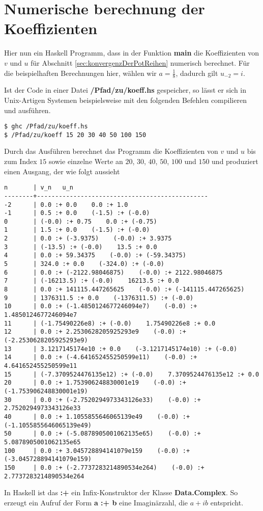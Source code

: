 \chapter{Numerische berechnung der Koeffizienten} \label{anh:Programm}
Hier nun ein Haskell Programm, dass in der Funktion \textbf{main} die
Koeffizienten von $v$ und $u$ für Abschnitt \ref{sec:konvergenzDerPotReihen} 
numerisch berechnet. Für die beispielhaften Berechnungen hier, wählen wir
$a=\frac{1}{8}$, dadurch gilt $u_{-2}=i$.


Ist der Code in einer Datei \textbf{/Pfad/zu/koeff.hs} gespeicher, so lässt er
sich in Unix-Artigen Systemen beispielsweise mit den folgenden Befehlen
compilieren und ausführen.
\begin{lstlisting}[style=Bash]
$ ghc /Pfad/zu/koeff.hs
$ /Pfad/zu/koeff 15 20 30 40 50 100 150
\end{lstlisting}
Durch das Ausführen berechnet das Programm die Koeffizienten von $v$ und $u$
bis zum Index $15$ sowie einzelne Werte an $20$, $30$, $40$, $50$, $100$ und
$150$ und produziert einen Ausgang, der wie folgt aussieht
\begin{lstlisting}[style=Bash]
n       | v_n   u_n
--------+-----------------------------------------------
-2      | 0.0 :+ 0.0    0.0 :+ 1.0
-1      | 0.5 :+ 0.0    (-1.5) :+ (-0.0)
0       | (-0.0) :+ 0.75    0.0 :+ (-0.75)
1       | 1.5 :+ 0.0    (-1.5) :+ (-0.0)
2       | 0.0 :+ (-3.9375)    (-0.0) :+ 3.9375
3       | (-13.5) :+ (-0.0)    13.5 :+ 0.0
4       | 0.0 :+ 59.34375    (-0.0) :+ (-59.34375)
5       | 324.0 :+ 0.0    (-324.0) :+ (-0.0)
6       | 0.0 :+ (-2122.98046875)    (-0.0) :+ 2122.98046875
7       | (-16213.5) :+ (-0.0)    16213.5 :+ 0.0
8       | 0.0 :+ 141115.447265625    (-0.0) :+ (-141115.447265625)
9       | 1376311.5 :+ 0.0    (-1376311.5) :+ (-0.0)
10      | 0.0 :+ (-1.4850124677246094e7)    (-0.0) :+ 1.4850124677246094e7
11      | (-1.75490226e8) :+ (-0.0)    1.75490226e8 :+ 0.0
12      | 0.0 :+ 2.2530628205925293e9    (-0.0) :+ (-2.2530628205925293e9)
13      | 3.1217145174e10 :+ 0.0    (-3.1217145174e10) :+ (-0.0)
14      | 0.0 :+ (-4.641652455250599e11)    (-0.0) :+ 4.641652455250599e11
15      | (-7.3709524476135e12) :+ (-0.0)    7.3709524476135e12 :+ 0.0
20      | 0.0 :+ 1.753906248830001e19    (-0.0) :+ (-1.753906248830001e19)
30      | 0.0 :+ (-2.7520294973343126e33)    (-0.0) :+ 2.7520294973343126e33
40      | 0.0 :+ 1.1055855646065139e49    (-0.0) :+ (-1.1055855646065139e49)
50      | 0.0 :+ (-5.0878905001062135e65)    (-0.0) :+ 5.0878905001062135e65
100     | 0.0 :+ 3.045728894141079e159    (-0.0) :+ (-3.045728894141079e159)
150     | 0.0 :+ (-2.7737283214890534e264)    (-0.0) :+ 2.7737283214890534e264
\end{lstlisting}
In Haskell ist das \textbf{:+} ein Infix-Konstruktor der Klasse
\textbf{Data.Complex}. So erzeugt ein Aufruf der Form \textbf{a :+ b} eine
Imaginärzahl, die $a+ib$ entspricht.

